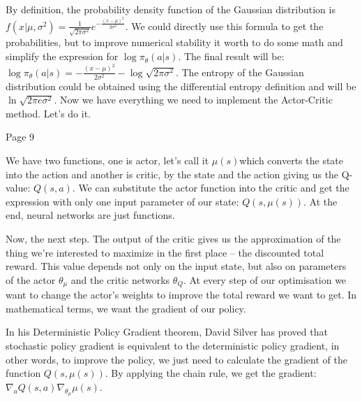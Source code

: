 By definition, the probability density function of the Gaussian distribution
is \begin{math}f(x|\mu,\sigma^2)=\frac{1}{\sqrt{2\pi\sigma^2}}e^{-\frac{(x-\mu)^2}{2\sigma^2}} \end{math}.
We could directly use this formula to get the probabilities, but to improve
numerical stability it worth to do some math and simplify the expression
for \begin{math}\log\pi_\theta(a|s)\end{math}. The final result will
be: \begin{math}\log\pi_\theta(a|s)=-\frac{(x-\mu)^2}{2\sigma^2}-\log\sqrt{2\pi\sigma^2} \end{math}.
The entropy of the Gaussian distribution could be obtained using the
differential entropy definition and will be \begin{math}\ln\sqrt{2\pi e
\sigma^2}\end{math}. Now we have everything we need to implement the
Actor-Critic method. Let’s do it.


Page 9

We have two functions, one is actor, let’s call it \begin{math}\mu(s)\end{math}which converts the state
into the action and another is critic, by the state and the action giving us the
Q-value: \begin{math}Q(s, a)\end{math}. We can substitute the actor function into the critic and get
the expression with only one input parameter of our state: \begin{math}Q(s, \mu(s))\end{math}. At the
end, neural networks are just functions.

Now, the next step. The output of the critic gives us the approximation of the
thing we’re interested to maximize in the first place -- the discounted total
reward. This value depends not only on the input state, but also on parameters
of the actor \begin{math}\theta_\mu\end{math} and the critic networks \begin{math}\theta_Q\end{math}. At every step of our optimisation we
want to change the actor’s weights to improve the total reward we want to
get. In mathematical terms, we want the gradient of our policy.

In his Deterministic Policy Gradient theorem, David Silver has proved that
stochastic policy gradient is equivalent to the deterministic policy gradient,
in other words, to improve the policy, we just need to calculate the gradient of
the function \begin{math}Q(s, \mu(s))\end{math}. By applying the chain rule, we
get the gradient: \begin{math}\nabla_aQ(s, a)\nabla_{\theta_{\mu}}\mu(s)\end{math}.


